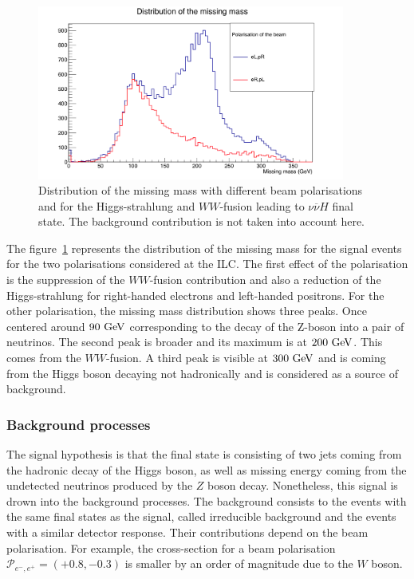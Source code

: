     \begin{figure}[!h]
      \centering
      \includegraphics[width = 0.9\textwidth]{Pictures/Higgs/mMiss.png}
      \caption{Distribution of the missing mass with different beam polarisations and for the Higgs-strahlung and $WW$-fusion leading to $\nu\overline{\nu}H$ final state.
      The background contribution is not taken into account here.}
      \label{fig:mMiss}
    \end{figure}

    The figure~\ref{fig:mMiss} represents the distribution of the missing mass for the signal events for the two polarisations considered at the \gls{ILC}.
    The first effect of the polarisation is the suppression of the $WW$-fusion contribution and also a reduction of the Higgs-strahlung for right-handed electrons and left-handed positrons.
    For the other polarisation, the missing mass distribution shows three peaks. 
    Once centered around $90~\rm{GeV}$ corresponding to the decay of the Z-boson into a pair of neutrinos.
    The second peak is broader and its maximum is at $200~\rm{GeV}$.
    This comes from the $WW$-fusion.
    A third peak is visible at $300~\rm{GeV}$ and is coming from the Higgs boson decaying not hadronically and is considered as a source of background.    

  \subsubsection{Background processes}

    The signal hypothesis is that the final state is consisting of two jets coming from the hadronic decay of the Higgs boson, as well as missing energy coming from the undetected neutrinos produced by the $Z$ boson decay.
    Nonetheless, this signal is drown into the background processes.
    The background consists to the events with the same final states as the signal, called irreducible background and the events with a similar detector response.
    Their contributions depend on the beam polarisation.
    For example, the cross-section for a beam polarisation $\mathcal{P}_{e^-,e^+} = (+0.8,-0.3)$ is smaller by an order of magnitude due to the $W$ boson.

